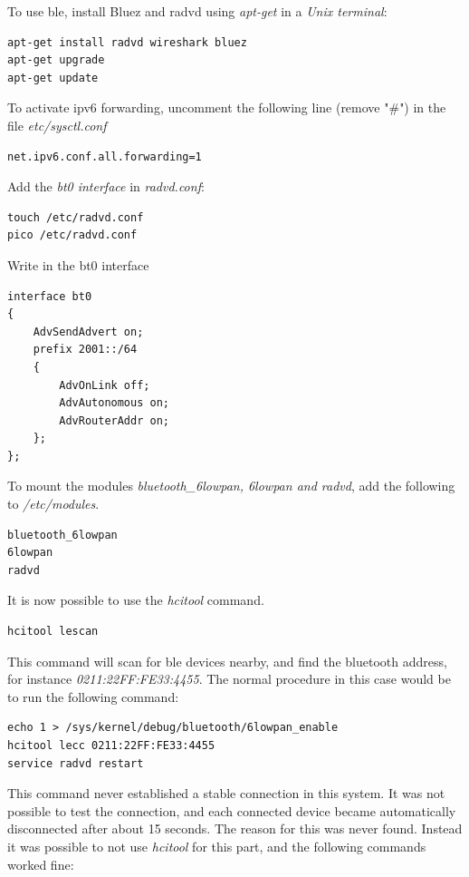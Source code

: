 To use \gls{ble}, install Bluez and radvd using \textit{apt-get} in a \textit{Unix terminal}:

\begin{verbatim}
apt-get install radvd wireshark bluez
apt-get upgrade
apt-get update
\end{verbatim}

To activate \gls{ipv6} forwarding, uncomment the following line (remove "\#") in the file \textit{etc/sysctl.conf}

\begin{verbatim}
net.ipv6.conf.all.forwarding=1
\end{verbatim}

Add the \textit{bt0 interface} in \textit{radvd.conf}:

\begin{verbatim}
touch /etc/radvd.conf
pico /etc/radvd.conf
\end{verbatim} 

Write in the bt0 interface

\begin{verbatim}
interface bt0
{
    AdvSendAdvert on;
    prefix 2001::/64
    {
        AdvOnLink off;
        AdvAutonomous on;
        AdvRouterAddr on;
    };
};
\end{verbatim} 

To mount the modules \textit{bluetooth\_6lowpan, 6lowpan and radvd}, add the following to \textit{/etc/modules}. 

\begin{verbatim}
bluetooth_6lowpan
6lowpan
radvd
\end{verbatim}

It is now possible to use the \textit{hcitool} command. 

\begin{verbatim}
hcitool lescan
\end{verbatim}

This command will scan for \gls{ble} devices nearby, and find the bluetooth address, for instance \textit{0211:22FF:FE33:4455}. The normal procedure in this case would be to run the following command: 

\begin{verbatim}
echo 1 > /sys/kernel/debug/bluetooth/6lowpan_enable
hcitool lecc 0211:22FF:FE33:4455
service radvd restart
\end{verbatim}

This command never established a stable connection in this system. It was not possible to test the connection, and each connected device became automatically disconnected after about 15 seconds. The reason for this was never found. Instead it was possible to not use \textit{hcitool} for this part, and the following commands worked fine:

